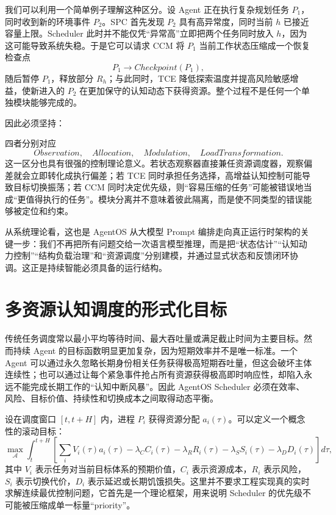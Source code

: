 我们可以利用一个简单例子理解这种区分。设 Agent 正在执行复杂规划任务 $P_1$，同时收到新的环境事件 $P_2$。SPC 首先发现 $P_2$ 具有高异常度，同时当前 $h$ 已接近容量上限。Scheduler 此时并不能仅凭“异常高”立即把两个任务同时放入 $h$，因为这可能导致系统失稳。于是它可以请求 CCM 将 $P_1$ 当前工作状态压缩成一个恢复检查点
\[
P_1\rightarrow Checkpoint(P_1),
\]
随后暂停 $P_1$，释放部分 $R_h$；与此同时，TCE 降低探索温度并提高风险敏感增益，使新进入的 $P_2$ 在更加保守的认知动态下获得资源。整个过程不是任何一个单独模块能够完成的。

因此必须坚持：
\begin{statementbox}
\centering
{}
\end{statementbox}
四者分别对应
\[
Observation,\quad
Allocation,\quad
Modulation,\quad
LoadTransformation.
\]
这一区分也具有很强的控制理论意义。若状态观察器直接兼任资源调度器，观察偏差就会立即转化成执行偏差；若 TCE 同时承担任务选择，高增益认知控制可能导致目标切换振荡；若 CCM 同时决定优先级，则“容易压缩的任务”可能被错误地当成“更值得执行的任务”。模块分离并不意味着彼此隔离，而是使不同类型的错误能够被定位和约束。

从系统理论看，这也是 AgentOS 从大模型 Prompt 编排走向真正运行时架构的关键一步：我们不再把所有问题交给一次语言模型推理，而是把“状态估计”“认知动力控制”“结构负载治理”和“资源调度”分别建模，并通过显式状态和反馈闭环协调。这正是持续智能必须具备的运行结构。

\section{多资源认知调度的形式化目标}

传统任务调度常以最小平均等待时间、最大吞吐量或满足截止时间为主要目标。然而持续 Agent 的目标函数明显更加复杂，因为短期效率并不是唯一标准。一个 Agent 可以通过永久忽略长期身份相关任务获得极高短期吞吐量，但这会破坏主体连续性；也可以通过让每个紧急事件抢占所有资源获得极高即时响应性，却陷入永远不能完成长期工作的“认知中断风暴”。因此 AgentOS Scheduler 必须在效率、风险、目标价值、持续性和切换成本之间取得动态平衡。

设在调度窗口 $[t,t+H]$ 内，进程 $P_i$ 获得资源分配 $a_i(\tau)$。可以定义一个概念性的滚动目标：
\[
\max_{\mathcal A}
\int_t^{t+H}
\left[
\sum_i
V_i(\tau)a_i(\tau)
-
\lambda_C C_i(\tau)
-
\lambda_R R_i(\tau)
-
\lambda_S S_i(\tau)
-
\lambda_D D_i(\tau)
\right]d\tau,
\]
其中 $V_i$ 表示任务对当前目标体系的预期价值，$C_i$ 表示资源成本，$R_i$ 表示风险，$S_i$ 表示切换代价，$D_i$ 表示延迟或长期饥饿损失。这里并不要求工程实现真的实时求解连续最优控制问题，它首先是一个理论框架，用来说明 Scheduler 的优先级不可能被压缩成单一标量“priority”。

